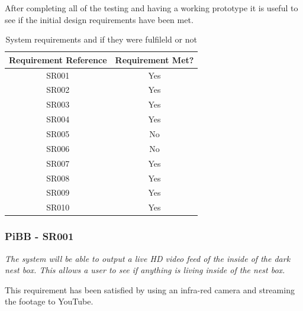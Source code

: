 \documentclass[10pt,a4paper]{article}
\begin{document}
After completing all of the testing and having a working prototype it is useful to see if the initial design requirements have been met.
\begin{table}[]
  \begin{tabular}{@{}cc@{}}
  \toprule
  \multicolumn{1}{l}{\textbf{Requirement Reference}} & \multicolumn{1}{l}{\textbf{Requirement Met?}} \\ \midrule
  SR001                                              & Yes                                           \\
  SR002                                              & Yes                                           \\
  SR003                                              & Yes                                           \\
  SR004                                              & Yes                                           \\
  SR005                                              & No                                            \\
  SR006                                              & No                                            \\
  SR007                                              & Yes                                           \\
  SR008                                              & Yes                                           \\
  SR009                                              & Yes                                           \\
  SR010                                              & Yes                                           \\ \bottomrule
  \end{tabular}
  \caption{System requirements and if they were fulfileld or not}
\label{tab:systemRequirements}
\end{table}

\subsubsection{PiBB - SR001}
\begin{center}
\textit{The system will be able to output a live HD video feed of the inside of the dark nest box. This allows a user to see if anything is living inside of the nest box.}
\linebreak
\end{center}
This requirement has been satisfied by using an infra-red camera and streaming the footage to YouTube. 
\end{document}
